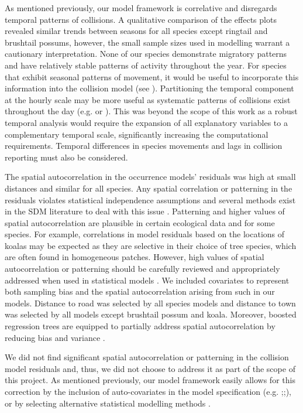 As mentioned previously, our model framework is correlative and disregards temporal patterns of collisions.  A qualitative comparison of the effects plots revealed similar trends between seasons for all species except ringtail and brushtail possums, however, the small sample sizes used in modelling warrant a cautionary interpretation. None of our species demonstrate migratory patterns and have relatively stable patterns of activity throughout the year. For species that exhibit seasonal patterns of movement, it would be useful to incorporate this information into the collision model (see \cite{neum12}). Partitioning the temporal component at the hourly scale may be more useful as systematic patterns of collisions exist throughout the day (e.g. \cite{litv08} or \cite{rhod14}). This was beyond the scope of this work as a robust temporal analysis would require the expansion of all explanatory variables to a complementary temporal scale, significantly increasing the computational requirements.  Temporal differences in species movements and lags in collision reporting must also be considered.

The spatial autocorrelation in the occurrence models' residuals was high at small distances and similar for all species.  Any spatial correlation or patterning in the residuals violates statistical independence assumptions and several methods exist in the SDM literature to deal with this issue \citep{augu96,dorm07,dorm13}.  Patterning and higher values of spatial autocorrelation are plausible in certain ecological data and for some species.  For example, correlations in model residuals based on the locations of koalas may be expected as they are selective in their choice of tree species, which are often found in homogeneous patches.  However, high values of spatial autocorrelation or patterning should be carefully reviewed and appropriately addressed when used in statistical models \citep{wint06}.  We included covariates to represent both sampling bias and the spatial autocorrelation arising from such in our models.  Distance to road was selected by all species models and distance to town was selected by all models except brushtail possum and koala.  Moreover, boosted regression trees are equipped to partially address spatial autocorrelation by reducing bias and variance \citep{elit08}.

We did not find significant spatial autocorrelation or patterning in the collision model residuals and, thus, we did not choose to address it as part of the scope of this project.  As mentioned previously, our model framework easily allows for this correction by the inclusion of auto-covariates in the model specification (e.g. \cite{dwye16};\cite{farm12};\cite{gome08}), or by selecting alternative statistical modelling methods \citep{zhan05}.

